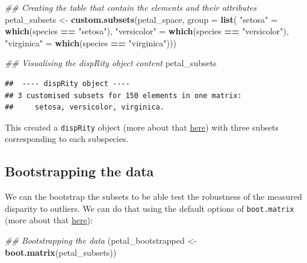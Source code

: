 \documentclass[
]{book}
\newenvironment{Shaded}{\begin{snugshade}}{\end{snugshade}}
\newcommand{\CommentTok}[1]{\textcolor[rgb]{0.56,0.35,0.01}{\textit{#1}}}
\newcommand{\DataTypeTok}[1]{\textcolor[rgb]{0.13,0.29,0.53}{#1}}
\newcommand{\KeywordTok}[1]{\textcolor[rgb]{0.13,0.29,0.53}{\textbf{#1}}}
\newcommand{\NormalTok}[1]{#1}
\newcommand{\OperatorTok}[1]{\textcolor[rgb]{0.81,0.36,0.00}{\textbf{#1}}}
\newcommand{\StringTok}[1]{\textcolor[rgb]{0.31,0.60,0.02}{#1}}
\begin{document}
\begin{Shaded}
\begin{Highlighting}[]
\CommentTok{\#\# Creating the table that contain the elements and their attributes}
\NormalTok{petal\_subsets \textless{}{-}}\StringTok{ }\KeywordTok{custom.subsets}\NormalTok{(petal\_space, }\DataTypeTok{group =} \KeywordTok{list}\NormalTok{(}
                                \StringTok{"setosa"}\NormalTok{ =}\StringTok{ }\KeywordTok{which}\NormalTok{(species }\OperatorTok{==}\StringTok{ "setosa"}\NormalTok{),}
                                \StringTok{"versicolor"}\NormalTok{ =}\StringTok{ }\KeywordTok{which}\NormalTok{(species }\OperatorTok{==}\StringTok{ "versicolor"}\NormalTok{),}
                                \StringTok{"virginica"}\NormalTok{ =}\StringTok{ }\KeywordTok{which}\NormalTok{(species }\OperatorTok{==}\StringTok{ "virginica"}\NormalTok{)))}

\CommentTok{\#\# Visualising the dispRity object content}
\NormalTok{petal\_subsets}
\end{Highlighting}
\end{Shaded}

\begin{verbatim}
##  ---- dispRity object ---- 
## 3 customised subsets for 150 elements in one matrix:
##     setosa, versicolor, virginica.
\end{verbatim}

This created a \texttt{dispRity} object (more about that \protect\hyperlink{guts}{here}) with three subsets corresponding to each subspecies.

\hypertarget{bootstrapping-the-data}{%
\subsection{Bootstrapping the data}\label{bootstrapping-the-data}}

We can the bootstrap the subsets to be able test the robustness of the measured disparity to outliers.
We can do that using the default options of \texttt{boot.matrix} (more about that \protect\hyperlink{bootstraps-and-rarefactions}{here}):

\begin{Shaded}
\begin{Highlighting}[]
\CommentTok{\#\# Bootstrapping the data}
\NormalTok{(petal\_bootstrapped \textless{}{-}}\StringTok{ }\KeywordTok{boot.matrix}\NormalTok{(petal\_subsets))}
\end{Highlighting}
\end{Shaded}
\end{document}
